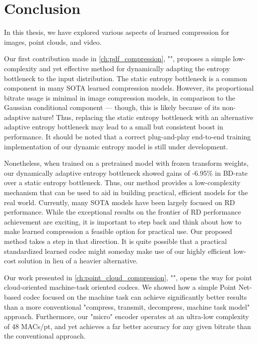 \chapter{Conclusion}

In this thesis, we have explored various aspects of learned compression for images, point clouds, and video.

Our first contribution made in \cref{ch:pdf_compression}, "", proposes a simple low-complexity and yet effective method for dynamically adapting the entropy bottleneck to the input distribution.
The static entropy bottleneck is a common component in many SOTA learned compression models.
However, its proportional bitrate usage is minimal in image compression models, in comparison to the Gaussian conditional component --- though, this is likely because of its non-adaptive nature!
Thus, replacing the static entropy bottleneck with an alternative adaptive entropy bottleneck may lead to a small but consistent boost in performance.
It should be noted that a correct plug-and-play end-to-end training implementation of our dynamic entropy model is still under development.

Nonetheless, when trained on a pretrained model with frozen transform weights, our dynamically adaptive entropy bottleneck showed gains of -6.95\% in BD-rate over a static entropy bottleneck.
Thus, our method provides a low-complexity mechanism that can be used to aid in building practical, efficient models for the real world.
Currently, many SOTA models have been largely focused on RD performance.
While the exceptional results on the frontier of RD performance achievement are exciting, it is important to step back and think about how to make learned compression a feasible option for practical use.
Our proposed method takes a step in that direction.
It is quite possible that a practical standardized learned codec might someday make use of our highly efficient low-cost solution in lieu of a heavier alternative.

Our work presented in \cref{ch:point_cloud_compression}, "", opens the way for point cloud-oriented machine-task oriented codecs.
We showed how a simple Point Net-based codec focused on the machine task can achieve significantly better results than a more conventional "compress, transmit, decompress, machine task model" approach.
Furthermore, our "micro" encoder operates at an ultra-low complexity of 48 MACs/pt, and yet achieves a far better accuracy for any given bitrate than the conventional approach.

